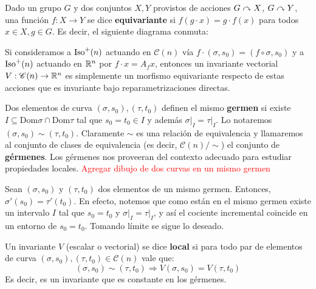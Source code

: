\begin{comm}
Dado un grupo $G$ y dos conjuntos $X,Y$ provistos de acciones $G\curvearrowright X$, $G\curvearrowright Y$, una función $f:X\to Y$ se dice \textbf{equivariante} si $f(g\cdot x)=g\cdot f(x)$ para todos $x\in X,g\in G$. Es decir, el siguiente diagrama conmuta:

\begin{center}
\end{center}

Si consideramos a $\operatorname{Iso}^+(n)$ actuando en $\mathscr{C}(n)$ vía $f\cdot (\sigma,s_0) = (f\circ\sigma,s_0)$ y a $\operatorname{Iso}^+(n)$ actuando en $\mathbb{R}^n$ por $f\cdot x = A_f x$, entonces un invariante vectorial $V:\mathscr{C}(n)\to\mathbb{R}^n$ es simplemente un morfismo equivariante respecto de estas acciones que es invariante bajo reparametrizaciones directas.
\end{comm}

\begin{defn}
Dos elementos de curva $(\sigma,s_0),(\tau,t_0)$ definen el mismo \textbf{germen} si existe $I\subseteq \mathrm{Dom}\sigma\cap\mathrm{Dom}\tau$ tal que $s_0=t_0\in I$ y además $\left.\sigma\right|_{I} = \left.\tau\right|_{I}$. Lo notaremos $(\sigma,s_0)\sim (\tau,t_0)$. Claramente $\sim$ es una relación de equivalencia y llamaremos al conjunto de clases de equivalencia (es decir, $\mathscr{C}(n)/\sim$) el conjunto de \textbf{gérmenes}. Los gérmenes nos proveeran del contexto adecuado para estudiar propiedades locales. \textcolor{red}{Agregar dibujo de dos curvas en un mismo germen}
\end{defn}

\begin{obs}\label{obs::germenderivadas}
Sean $(\sigma,s_0)$ y $(\tau,t_0)$ dos elementos de un mismo germen. Entonces, $\sigma'(s_0)=\tau'(t_0)$. En efecto, notemos que como están en el mismo germen existe un intervalo $I$ tal que $s_0=t_0$ y $\left.\sigma\right|_{I}=\left.\tau\right|_{I}$, y así el cociente incremental coincide en un entorno de $s_0=t_0$. Tomando límite se sigue lo deseado.
\end{obs}

\begin{defn}
Un invariante $V$ (escalar o vectorial) se dice \textbf{local} si para todo par de elementos de curva $(\sigma,s_0),(\tau,t_0)\in\mathscr{C}(n)$ vale que: $$(\sigma,s_0)\sim(\tau,t_0) \Longrightarrow V(\sigma,s_0) = V(\tau,t_0)$$ Es decir, es un invariante que es constante en los gérmenes.
\end{defn}

